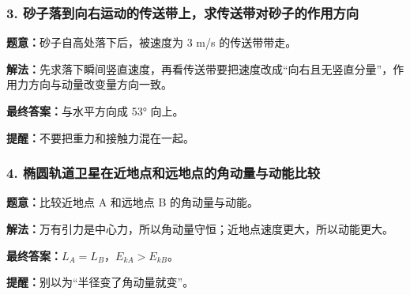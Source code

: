 \documentclass[12pt,a4paper]{ctexart}
\begin{document}
\subsubsection*{3. 砂子落到向右运动的传送带上，求传送带对砂子的作用方向}
\begin{tcolorbox}[colback=gray!2!white,colframe=black!60,title={题目}]
\textbf{题意：}砂子自高处落下后，被速度为 3 m/s 的传送带带走。\par
\end{tcolorbox}
\begin{tcolorbox}[colback=blue!2!white,colframe=blue!55!black,title={完整答案}]
\textbf{解法：}先求落下瞬间竖直速度，再看传送带要把速度改成“向右且无竖直分量”，作用力方向与动量改变量方向一致。\par
\textbf{最终答案：}与水平方向成 53° 向上。\par

\end{tcolorbox}
\begin{tcolorbox}[colback=red!2!white,colframe=red!55!black,title={易错点}]
\textbf{提醒：}不要把重力和接触力混在一起。\par
\end{tcolorbox}

\subsubsection*{4. 椭圆轨道卫星在近地点和远地点的角动量与动能比较}
\begin{tcolorbox}[colback=gray!2!white,colframe=black!60,title={题目}]
\textbf{题意：}比较近地点 A 和远地点 B 的角动量与动能。\par
\end{tcolorbox}
\begin{tcolorbox}[colback=blue!2!white,colframe=blue!55!black,title={完整答案}]
\textbf{解法：}万有引力是中心力，所以角动量守恒；近地点速度更大，所以动能更大。\par
\textbf{最终答案：}\(L_A=L_B\)，\(E_{kA}>E_{kB}\)。\par

\end{tcolorbox}
\begin{tcolorbox}[colback=red!2!white,colframe=red!55!black,title={易错点}]
\textbf{提醒：}别以为“半径变了角动量就变”。\par
\end{tcolorbox}
\end{document}
